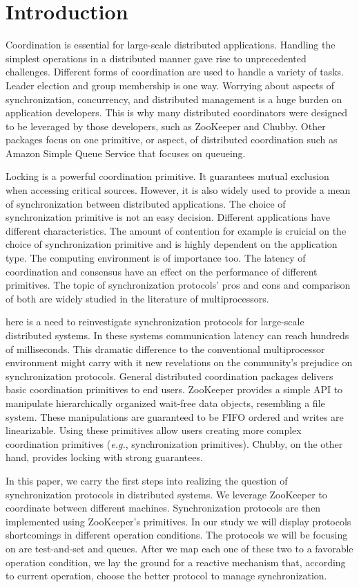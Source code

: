 \section{Introduction}\label{sec:intro}

Coordination is essential for large-scale distributed applications. Handling the simplest operations in a distributed manner gave rise to unprecedented challenges. Different forms of coordination are used to handle a variety of tasks. Leader election and group membership is one way. Worrying about aspects of synchronization, concurrency, and distributed management is a huge burden on application developers. This is why many distributed coordinators were designed to be leveraged by those developers, such as ZooKeeper and Chubby. Other packages focus on one primitive, or aspect, of distributed coordination such as Amazon Simple Queue Service that focuses on queueing.

Locking is a powerful coordination primitive. It guarantees mutual exclusion when accessing critical sources. However, it is also widely used to provide a mean of synchronization between distributed applications. The choice of synchronization primitive is not an easy decision. Different applications have different characteristics. The amount of contention for example is cruicial on the choice of synchronization primitive and is highly dependent on the application type. The computing environment is of importance too. The latency of coordination and consensus have an effect on the performance of different primitives. The topic of synchronization protocols' pros and cons and comparison of both are widely studied in the literature of multiprocessors.

here is a need to reinvestigate synchronization protocols for large-scale distributed systems. In these systems communication latency can reach hundreds of milliseconds. This dramatic difference to the conventional multiprocessor environment might carry with it new revelations on the community's prejudice on synchronization protocols. General distributed coordination packages delivers basic coordination primitives to end users. ZooKeeper provides a simple API to manipulate hierarchically organized wait-free data objects, resembling a file system. These manipulations are guaranteed to be FIFO ordered and writes are linearizable. Using these primitives allow users creating more complex coordination primitives (\emph{e.g.}, synchronization primitives). Chubby, on the other hand, provides locking with strong guarantees.

In this paper, we carry the first steps into realizing the question of synchronization protocols in distributed systems. We leverage ZooKeeper to coordinate between different machines. Synchronization protocols are then implemented using ZooKeeper's primitives. In our study we will display protocols shortcomings in different operation conditions. The protocols we will be focusing on are test-and-set and queues. After we map each one of these two to a favorable operation condition, we lay the ground for a reactive mechanism that, according to current operation, choose the better protocol to manage synchronization.